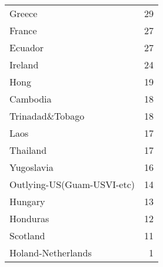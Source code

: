 \begin{table}
\begin{tabular}{lr}
 Greece                     &              29 \\
 France                     &              27 \\
 Ecuador                    &              27 \\
 Ireland                    &              24 \\
 Hong                       &              19 \\
 Cambodia                   &              18 \\
 Trinadad\&Tobago            &              18 \\
 Laos                       &              17 \\
 Thailand                   &              17 \\
 Yugoslavia                 &              16 \\
 Outlying-US(Guam-USVI-etc) &              14 \\
 Hungary                    &              13 \\
 Honduras                   &              12 \\
 Scotland                   &              11 \\
 Holand-Netherlands         &               1 \\
\bottomrule
\end{tabular}
\end{table}

